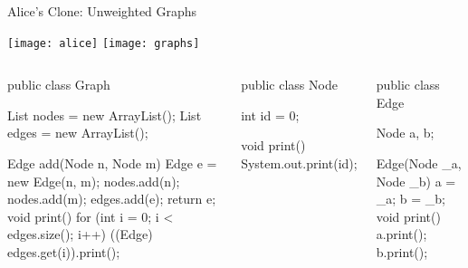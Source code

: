\begin{frame}[fragile]{Alice's Clone: Unweighted Graphs}
	\vspace{-1.5cm}
	\begin{flushright}
		\texttt{[image: alice]}
		\texttt{[image: graphs]}
	\end{flushright}
	\begin{tiny}
		\begin{columns}
				\vspace{-3mm}				
\vspace{3mm}
\begin{codetight}{}
public class Graph {
	List nodes = new ArrayList();
	List edges = new ArrayList();

	Edge add(Node n, Node m) {
		Edge e = new Edge(n, m);
		nodes.add(n); nodes.add(m); edges.add(e);
		return e;
	}
	void print() {
		for (int i = 0; i < edges.size(); i++) {
			((Edge) edges.get(i)).print();
		}
	}
}
\end{codetight}
\begin{codetight}{}
public class Node {
	int id = 0;

	void print() {
		System.out.print(id);
	}
}
\end{codetight}
\begin{codetight}{}
public class Edge {
	Node a, b;

	Edge(Node _a, Node _b) {
		a = _a; b = _b;
	}
	void print() {
		a.print(); b.print();
	}
}
\end{codetight}
		\end{columns}
	\end{tiny}
\end{frame}

